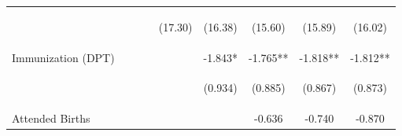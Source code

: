 \documentclass[10pt,letterpaper,subeqn, xcolor=table]{beamer}
\begin{document}
\begin{frame}[label=otherPANEL]
\begin{table}[htpb!]
\begin{center}
{\begin{tabular}{lcccccccc}
        & \begin{footnotesize}\end{footnotesize} & \begin{footnotesize}\end{footnotesize} & \begin{footnotesize}\end{footnotesize} & \begin{footnotesize}(17.30)\end{footnotesize} & \begin{footnotesize}(16.38)\end{footnotesize} & \begin{footnotesize}(15.60)\end{footnotesize} & \begin{footnotesize}(15.89)\end{footnotesize} & \begin{footnotesize}(16.02)\end{footnotesize} \\

        Immunization (DPT)&&&&&-1.843*&-1.765**&-1.818**&-1.812**\\

        & \begin{footnotesize}\end{footnotesize} & \begin{footnotesize}\end{footnotesize} & \begin{footnotesize}\end{footnotesize} & \begin{footnotesize}\end{footnotesize} & \begin{footnotesize}(0.934)\end{footnotesize} & \begin{footnotesize}(0.885)\end{footnotesize} & \begin{footnotesize}(0.867)\end{footnotesize} & \begin{footnotesize}(0.873)\end{footnotesize} \\

        Attended Births&&&&&&-0.636&-0.740&-0.870\\


\end{tabular}}
\end{center}
\end{table}
\end{frame}
\end{document}
